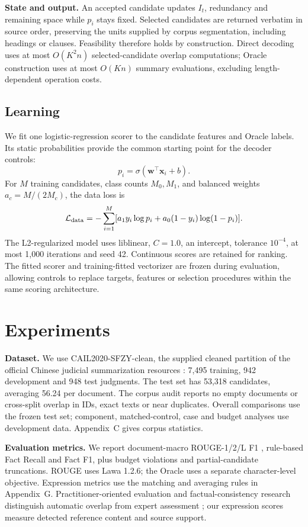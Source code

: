 \documentclass[10pt,twocolumn,letterpaper]{article}
\begin{document}
\textbf{State and output.} An accepted candidate updates $I_t$, redundancy and remaining space while $p_i$ stays fixed. Selected candidates are returned verbatim in source order, preserving the units supplied by corpus segmentation, including headings or clauses. Feasibility therefore holds by construction. Direct decoding uses at most $O(K^2n)$ selected-candidate overlap computations; Oracle construction uses at most $O(Kn)$ summary evaluations, excluding length-dependent operation costs.

\subsection{Learning}\label{learning}
We fit one logistic-regression scorer to the candidate features and Oracle labels. Its static probabilities provide the common starting point for the decoder controls:
\begin{equation}
p_i=\sigma(\mathbf w^\top\mathbf x_i+b).
\end{equation}
For $M$ training candidates, class counts $M_0,M_1$, and balanced weights $a_c=M/(2M_c)$, the data loss is
\begin{equation}
\mathcal L_{\rm data}=-\sum_{i=1}^M[a_1y_i\log p_i+a_0(1-y_i)\log(1-p_i)].
\end{equation}
The L2-regularized model uses liblinear, $C=1.0$, an intercept, tolerance $10^{-4}$, at most 1,000 iterations and seed 42. Continuous scores are retained for ranking. The fitted scorer and training-fitted vectorizer are frozen during evaluation, allowing controls to replace targets, features or selection procedures within the same scoring architecture.

\section{Experiments}\label{experiments}
\textbf{Dataset.} We use CAIL2020-SFZY-clean, the supplied cleaned partition of the official Chinese judicial summarization resources \citep{ref12}: 7,495 training, 942 development and 948 test judgments. The test set has 53,318 candidates, averaging 56.24 per document. The corpus audit reports no empty documents or cross-split overlap in IDs, exact texts or near duplicates. Overall comparisons use the frozen test set; component, matched-control, case and budget analyses use development data. Appendix~C gives corpus statistics.

\textbf{Evaluation metrics.} We report document-macro ROUGE-1/2/L F1 \citep{rouge2004}, rule-based Fact Recall and Fact F1, plus budget violations and partial-candidate truncations. ROUGE uses Lawa 1.2.6; the Oracle uses a separate character-level objective. Expression metrics use the matching and averaging rules in Appendix~G. Practitioner-oriented evaluation and factual-consistency research distinguish automatic overlap from expert assessment \citep{ref10,ref11}; our expression scores measure detected reference content and source support.
\end{document}
